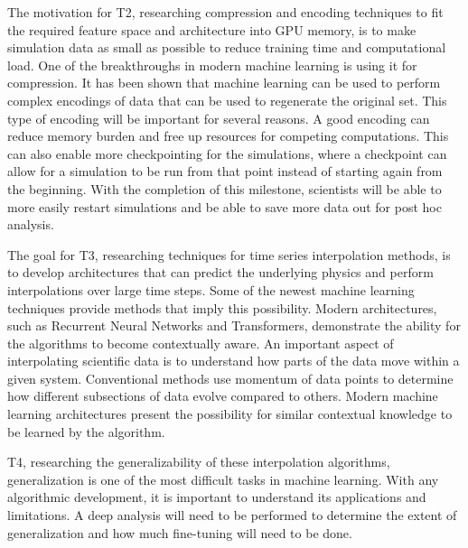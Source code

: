 \documentclass[12pt]{article}
\begin{document}
The motivation for T2, researching compression and encoding techniques to  
fit the required feature space and architecture into GPU memory, is to make
simulation data as small as possible to reduce training time and 
computational load. One of the breakthroughs in modern machine learning is using
it for compression. It has been shown that machine learning can be used to
perform complex encodings of data that can be used to regenerate the original
set. This type of encoding will be important for several reasons. A
good encoding can reduce memory burden and free up resources for
competing computations. This can also enable more checkpointing for the
simulations, where a checkpoint can allow for a simulation to be run from that
point instead of starting again from the beginning. With the completion of this
milestone, scientists will be able to more easily restart simulations and be able
to save more data out for post hoc analysis.

The goal for T3, researching techniques for time series interpolation methods,
is to develop architectures that can predict the underlying physics and perform
interpolations over large time steps. Some of the newest machine learning
techniques provide methods that imply this possibility. Modern architectures,
such as Recurrent Neural Networks and Transformers, demonstrate the
ability for the algorithms to become contextually aware. An important aspect of
interpolating scientific data is to understand how parts of the data move within
a given system. Conventional methods use momentum of data points to determine
how different subsections of data evolve compared to others. Modern machine
learning architectures present the possibility for similar contextual knowledge
to be learned by the algorithm.

T4, researching the generalizability of these
interpolation algorithms, generalization is one of the most difficult tasks in
machine learning. With any algorithmic development, it is important to understand
its applications and limitations. A deep analysis will need to be performed to
determine the extent of generalization and how much fine-tuning will need to be
done. 
\end{document}
